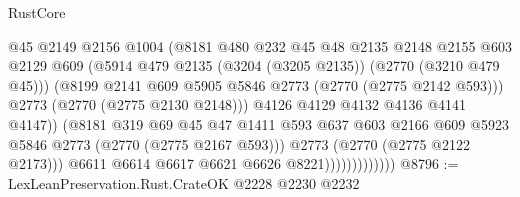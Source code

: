 \begin{lexlean}{RustCore}
\begin{coremodule}
                                    @45
                                    @2149
                                    @2156
                                    @1004
                                    (@8181
                                      @480
                                      @232
                                      @45
                                      @48
                                      @2135
                                      @2148
                                      @2155
                                      @603
                                      @2129
                                      @609
                                      (@5914
                                        @479
                                        @2135
                                        (@3204 (@3205 @2135))
                                        (@2770 (@3210 @479 @45)))
                                      (@8199
                                        @2141
                                        @609
                                        @5905
                                        @5846
                                        @2773
                                        (@2770 (@2775 @2142 @593)))
                                      @2773
                                      (@2770 (@2775 @2130 @2148)))
                                    @4126
                                    @4129
                                    @4132
                                    @4136
                                    @4141
                                    @4147))
                                (@8181
                                  @319
                                  @69
                                  @45
                                  @47
                                  @1411
                                  @593
                                  @637
                                  @603
                                  @2166
                                  @609
                                  @5923
                                  @5846
                                  @2773
                                  (@2770 (@2775 @2167 @593)))
                                @2773
                                (@2770 (@2775 @2122 @2173)))
                              @6611
                              @6614
                              @6617
                              @6621
                              @6626
                              @8221)))))))))))))
@8796 := LexLeanPreservation.Rust.CrateOK @2228 @2230 @2232

\end{coremodule}
\end{lexlean}
